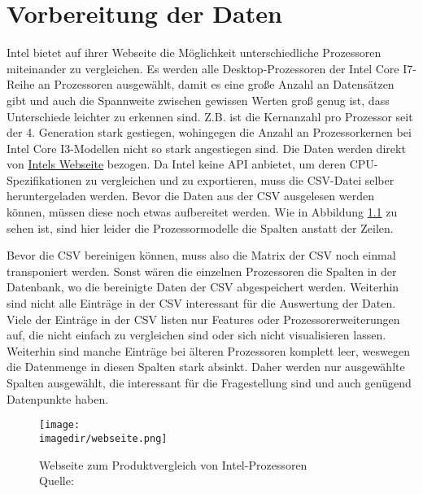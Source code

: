 \chapter{Vorbereitung der Daten}

Intel bietet auf ihrer Webseite die Möglichkeit unterschiedliche Prozessoren miteinander zu vergleichen.
Es werden alle Desktop-Prozessoren der Intel Core I7-Reihe an Prozessoren ausgewählt, damit es eine große Anzahl an Datensätzen gibt und auch die Spannweite zwischen gewissen Werten groß genug ist, dass Unterschiede leichter zu erkennen sind.
Z.B. ist die Kernanzahl pro Prozessor seit der 4. Generation stark gestiegen, wohingegen die Anzahl an Prozessorkernen bei Intel Core I3-Modellen nicht so stark angestiegen sind.
Die Daten werden direkt von \href{https://www.intel.de/content/www/de/de/products/compare.html?productIds=212279,212280,212047,212048,212251,199325,199335,199314,199316,199318,191048,191792,193738,190885,186604,148263,140642,126684,97129,93339,88200,88195,87718,88040,80807,80808,80809,80814,80806,77656,76642,75121,75122,75123,75124,75125,236781,236794,236854,236783,236789,230492,230490,230491,230500,230489,134596,134591,134592,134594,134595,129948,126686,97122,97128,88196}{Intels Webseite} bezogen.
Da Intel keine API anbietet, um deren CPU-Spezifikationen zu vergleichen und zu exportieren, muss die CSV-Datei selber heruntergeladen werden. 
Bevor die Daten aus der CSV ausgelesen werden können, müssen diese noch etwas aufbereitet werden.
Wie in Abbildung \ref{fig:intel_webseite} zu sehen ist, sind hier leider die Prozessormodelle die Spalten anstatt der Zeilen. 


Bevor die CSV bereinigen können, muss also die  Matrix der CSV noch einmal transponiert werden.
Sonst wären die einzelnen Prozessoren die Spalten in der Datenbank, wo die bereinigte Daten der CSV abgespeichert werden.
Weiterhin sind nicht alle Einträge in der CSV interessant für die Auswertung der Daten.
Viele der Einträge in der CSV listen nur Features oder Prozessorerweiterungen auf, die nicht einfach zu vergleichen sind oder sich nicht visualisieren lassen.
Weiterhin sind manche Einträge bei älteren Prozessoren komplett leer, weswegen die Datenmenge in diesen Spalten stark absinkt.
Daher werden nur ausgewählte Spalten ausgewählt, die interessant für die Fragestellung sind und auch genügend Datenpunkte haben.

\cleardoublepage

\begin{figure}
	\centering 
	\texttt{[image: \\imagedir/webseite.png]} 
	\captionsetup{format=hang}
	\caption[Webseite von Intel]{\label{fig:intel_webseite}Webseite zum Produktvergleich von Intel-Prozessoren \\Quelle: \cite{i7_intel_2024}}
\end{figure}

